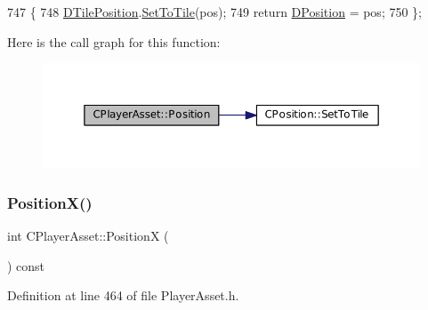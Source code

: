 \begin{DoxyCode}
747                                                     \{
748     \hyperlink{classCPlayerAsset_a5b59a9d3b7db8c7fa194b80dafb96186}{DTilePosition}.\hyperlink{classCPosition_ae302aa21792de64c97de29e2cbbfeb94}{SetToTile}(pos);
749     \textcolor{keywordflow}{return} \hyperlink{classCPlayerAsset_aa9f53c009b181c7c5647c6b03776a04c}{DPosition} = pos;
750 \};
\end{DoxyCode}
Here is the call graph for this function\+:\nopagebreak
\begin{figure}[H]
\begin{center}
\leavevmode
\includegraphics[width=350pt]{classCPlayerAsset_a8c3ed4ab81f79aa28faec6bf790a0a79_cgraph}
\end{center}
\end{figure}
\hypertarget{classCPlayerAsset_a9cf8961ac97f2928d1e08bc4f311f220}{}\label{classCPlayerAsset_a9cf8961ac97f2928d1e08bc4f311f220} 
\subsubsection{\texorpdfstring{Position\+X()}{PositionX()}\hspace{0.1cm}{\footnotesize\ttfamily [1/2]}}
{\footnotesize\ttfamily int C\+Player\+Asset\+::\+PositionX (\begin{DoxyParamCaption}{ }\end{DoxyParamCaption}) const\hspace{0.3cm}{\ttfamily [inline]}}



Definition at line 464 of file Player\+Asset.\+h.


